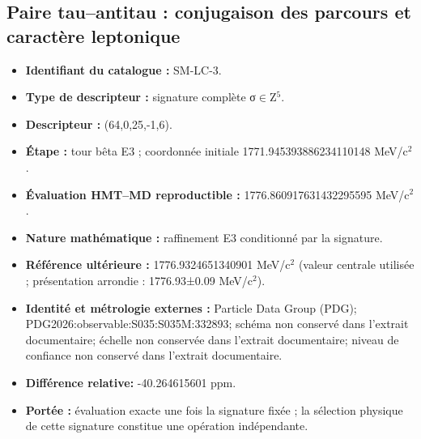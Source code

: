 \subsection{Paire tau–antitau : conjugaison des parcours et caractère leptonique}
\begin{itemize}
\item \textbf{Identifiant du catalogue :} SM-LC-3.
\item \textbf{Type de descripteur :} signature complète σ\(\in\)Z\({}^{5}\).
\item \textbf{Descripteur :} (64,0,25,-1,6).
\item \textbf{Étape :} tour bêta E3 ; coordonnée initiale 1771.945393\allowbreak{}886234\allowbreak{}110148 MeV/c\({}^{2}\).
\item \textbf{Évaluation HMT--MD reproductible :} 1776.860917\allowbreak{}631432\allowbreak{}295595 MeV/c\({}^{2}\).
\item \textbf{Nature mathématique :} raffinement E3 conditionné par la signature.
\item \textbf{Référence ultérieure :} 1776.932465\allowbreak{}134090\allowbreak{}1 MeV/c\({}^{2}\) (valeur centrale utilisée ; présentation arrondie : 1776.93±\allowbreak{}0.09 MeV/c\({}^{2}\)).
\item \textbf{Identité et métrologie externes :} Particle Data Group (PDG); PDG2026:\allowbreak{}observable:\allowbreak{}S035:\allowbreak{}S035M:\allowbreak{}332893; schéma non conservé dans l’extrait documentaire; échelle non conservée dans l’extrait documentaire; niveau de confiance non conservé dans l’extrait documentaire.
\item \textbf{Différence relative:} -40.264615\allowbreak{}601 ppm.
\item \textbf{Portée :} évaluation exacte une fois la signature fixée ; la sélection physique de cette signature constitue une opération indépendante.
\end{itemize}
